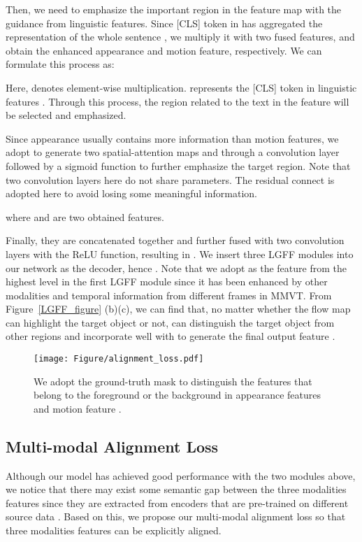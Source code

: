 \documentclass[10pt,twocolumn,letterpaper]{article}
\begin{document}
Then, we need to emphasize the important region in the feature map with the guidance from linguistic features. Since [CLS] token in  has aggregated the representation of the whole sentence \cite{devlin2018bert}, we multiply it with two fused features, and obtain the enhanced appearance and motion feature, respectively. We can formulate this process as:


Here,  denotes element-wise multiplication.  represents the [CLS] token in linguistic features . Through this process, the region related to the text in the feature will be selected and emphasized.


Since appearance usually contains more information than motion features, we adopt  to generate two spatial-attention maps  and   through a  convolution layer followed by a sigmoid function to further emphasize the target region. Note that two convolution layers here do not share parameters. The residual connect is adopted here to avoid losing some meaningful information.
\vspace{-2mm}

\vspace{-4mm}

where  and  are two obtained features.


Finally, they are concatenated together and further fused with two  convolution layers with the ReLU function, resulting in .
We insert three LGFF modules into our network as the decoder, hence . Note that we adopt  as the feature from the highest level  in the first LGFF module since it has been enhanced by other modalities and temporal information from different frames in MMVT. From Figure~\ref{LGFF_figure} (b)(c), we can find that, no matter whether the flow map can highlight the target object or not,  can distinguish the target object from other regions and incorporate well with  to generate the final output feature .

\begin{figure}[!t]
    \centering
    \texttt{[image: Figure/alignment\_loss.pdf]}
    \caption{We adopt the ground-truth mask to distinguish the features that belong to the foreground or the background in appearance features and motion feature .}  \label{alignmentlss_figure}
    \vspace{-0.4cm}
\end{figure}


\subsection{Multi-modal Alignment Loss} \label{MMAL}
\vspace{-2mm}
Although our model has achieved good performance with the two modules above, we notice that there may exist some semantic gap between the three modalities features since they are extracted from encoders that are pre-trained on different source data \cite{huang2020pixel}. Based on this, we propose our multi-modal alignment loss so that three modalities features can be explicitly aligned.  
\end{document}
